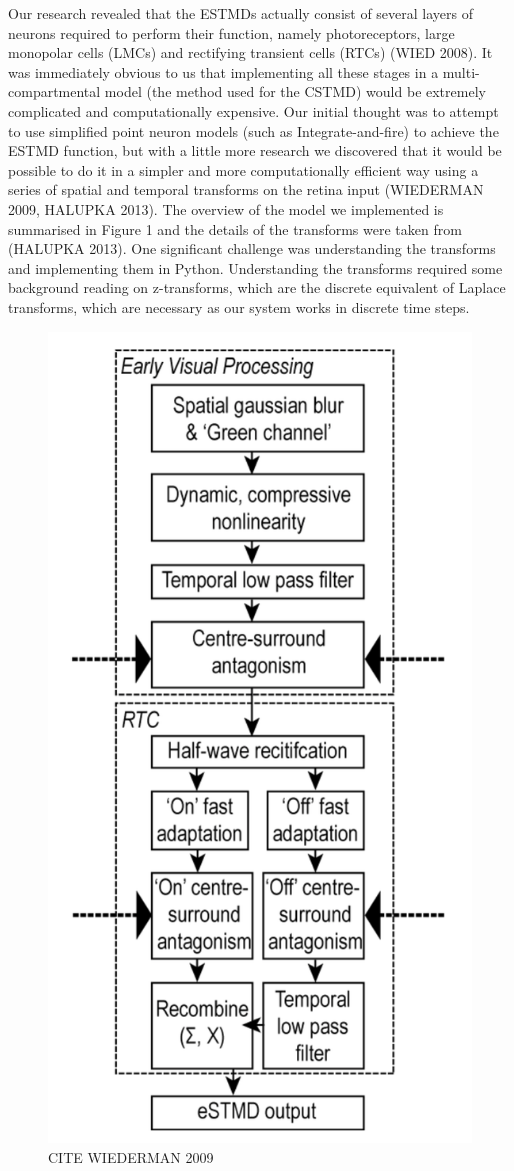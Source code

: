 \documentclass[a4paper,11pt]{article}
\begin{document}
Our research revealed that the ESTMDs actually consist of several layers of neurons required to perform their function, namely photoreceptors, large monopolar cells (LMCs) and rectifying transient cells (RTCs) (WIED 2008). It was immediately obvious to us that implementing all these stages in a multi-compartmental model (the method used for the CSTMD) would be extremely complicated and computationally expensive. Our initial thought was to attempt to use simplified point neuron models (such as Integrate-and-fire) to achieve the ESTMD function, but with a little more research we discovered that it would be possible to do it in a simpler and more computationally efficient way using a series of spatial and temporal transforms on the retina input (WIEDERMAN 2009, HALUPKA 2013). The overview of the model we implemented is summarised in Figure 1 and the details of the transforms were taken from (HALUPKA 2013). 
One significant challenge was understanding the transforms and implementing them in Python. Understanding the transforms required some background reading on z-transforms, which are the discrete equivalent of Laplace transforms, which are necessary as our system works in discrete time steps. 
\begin{figure}
\centering
\includegraphics[scale = 0.5]{wiederman09}
\caption{CITE WIEDERMAN 2009}
\end{figure}
\end{document}
